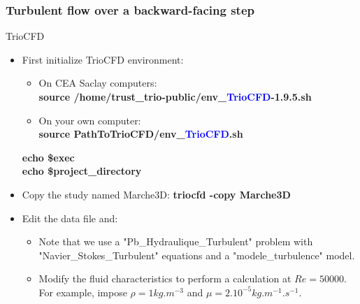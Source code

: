 \documentclass[10pt, hyperref={unicode=true,pdfusetitle, bookmarks=true,bookmarksnumbered=false,bookmarksopen=false, breaklinks=false,pdfborder={0 0l 1},backref=true,colorlinks=true,linkcolor=darkblue,pageanchor}]{beamer}
\begin{document}
\begin{frame}
\frametitle{Turbulent flow over a backward-facing step}\label{init_triocfd}
\begin{block}{TrioCFD}

\begin{itemize}
\item First initialize TrioCFD environment:\\
{\small{
\begin{itemize}
\item On CEA Saclay computers:\\
\textbf{source /home/trust\_trio-public/env\_\textcolor{blue}{TrioCFD}-1.9.5.sh }

\item On your own computer:\\
\textbf{source PathToTrioCFD/env\_\textcolor{blue}{TrioCFD}.sh}

\end{itemize}
\textbf{echo \$exec} \\
\textbf{echo \$project\_directory} \\
}}

\item Copy the study named Marche3D: 
\textbf{triocfd -copy Marche3D}

\item Edit the data file and: \\
    \begin{itemize}
    \item [$\circ$] Note that we use a "Pb\_Hydraulique\_Turbulent" problem with "Navier\_Stokes\_Turbulent" equations and a "modele\_turbulence" model.
    \item [$\circ$] Modify the fluid characteristics to perform a calculation at $Re=50000$. For example, impose $\rho = 1 kg.m^{-3}$ and $\mu=2.10^{-5} kg.m^{-1}.s^{-1}$.
    \end{itemize}

\end{itemize}

\end{block}
\end{frame}
\end{document}

